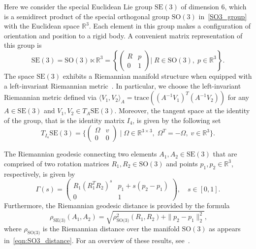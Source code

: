\documentclass[12pt]{article}
\begin{document}
Here we consider the special Euclidean Lie group $\text{SE}(3)$ of dimension 6, which is a semidirect product of the special orthogonal group $\text{SO}(3)$ in~\eqref{SO3_group} with the Euclidean space $\mathbb{R}^3$. Each element in this group makes a configuration of orientation and position to a rigid body. A convenient matrix representation of this group is
\begin{equation*}
\text{SE}(3)=\text{SO}(3)\ltimes\mathbb{R}^3 = \left\{\begin{pmatrix}
        R & p \\
        0 & 1
    \end{pmatrix}
\bigg| \; R\in\text{SO}(3), \; p\in\mathbb{R}^3
\right\}.
\end{equation*}
The space $\text{SE}(3)$ exhibits a Riemannian manifold structure when equipped with a left-invariant Riemannian metric~\cite{doCarmo1992, kirillov2008introduction}. In particular, we choose the left-invariant Riemannian metric defined via $\langle V_1,V_2\rangle_A=\text{trace}((A^{-1}V_1)^T(A^{-1}V_2))$ for any $A\in\text{SE}(3)$ and $V_1,V_2\in T_A\text{SE}(3)$. Moreover, the tangent space at the identity of the group, that is the identity matrix $I_4$, is given by the following set
\begin{equation*}
    T_{I_4}\text{SE}(3) = \bigg\{\begin{pmatrix}
        \Omega & v \\
        0 & 0
    \end{pmatrix}\;\bigg|\;\Omega\in\mathbb{R}^{3\times 3},\;\Omega^T = -\Omega,\;v\in\mathbb{R}^3\bigg\}.
\end{equation*}

The Riemannian geodesic connecting two elements $A_1,A_2\in\text{SE}(3)$ that are comprised of two rotation matrices $R_1,R_2\in\text{SO}(3)$ and points $p_1, p_2\in\mathbb{R}^3$, respectively, is given by
\begin{equation}
    \Gamma(s)=\begin{pmatrix}
        R_1(R_1^TR_2)^s & p_1+s(p_2-p_1) \\
        0 & 1
    \end{pmatrix}, \quad s\in[0,1].
\end{equation}
Furthermore, the Riemannian geodesic distance is provided by the formula
\begin{equation}~\label{eqn:SE3_distance}
    \rho_{\text{SE(3)}}(A_1, A_2) = \sqrt{\rho_{\text{SO(3)}}^2(R_1, R_2)+\|p_2-p_1\|^2_2},
\end{equation}
where $\rho_{\text{SO(3)}}$ is the Riemannian distance over the manifold $\text{SO}(3)$ as appears in~\eqref{eqn:SO3_distance}. For an overview of these results, see~\cite{duan2013riemannian, vzefran1996choice}.
\end{document}
